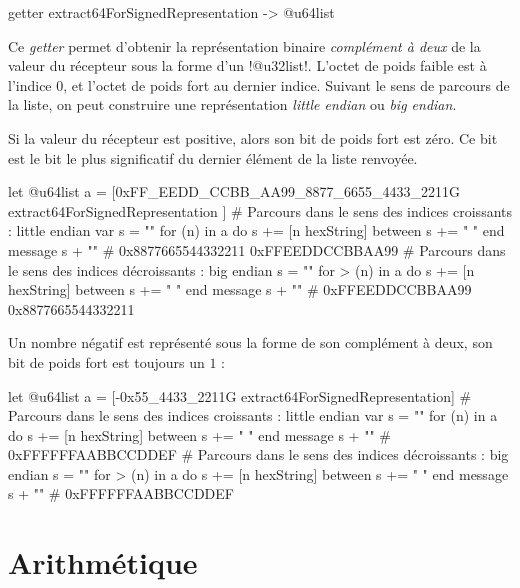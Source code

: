 
\begin{galgas4box}
getter extract64ForSignedRepresentation -> @u64list
\end{galgas4box}

Ce \emph{getter} permet d'obtenir la représentation binaire \emph{complément à deux} de la valeur du récepteur sous la forme d'un \ggsq!@u32list!. L'octet de poids faible est à l'indice $0$, et l'octet de poids fort au dernier indice. Suivant le sens de parcours de la liste, on peut construire une représentation \emph{little endian} ou \emph{big endian}.

Si la valeur du récepteur est positive, alors son bit de poids fort est zéro. Ce bit est le bit le plus significatif du dernier élément de la liste renvoyée.

\begin{galgas4}
let @u64list a = [0xFF_EEDD_CCBB_AA99_8877_6655_4433_2211G
  extract64ForSignedRepresentation
]
# Parcours dans le sens des indices croissants : little endian
var s = ""
for (n) in a
  do s += [n hexString]
  between s += " "
end
message s + "\n" # 0x8877665544332211 0xFFEEDDCCBBAA99
# Parcours dans le sens des indices décroissants : big endian
s = ""
for > (n) in a
  do s += [n hexString]
  between s += " "
end
message s + "\n" # 0xFFEEDDCCBBAA99 0x8877665544332211
\end{galgas4}

Un nombre négatif est représenté sous la forme de son complément à deux, son bit de poids fort est toujours un $1$ :

\begin{galgas4}
let @u64list a = [-0x55_4433_2211G extract64ForSignedRepresentation]
# Parcours dans le sens des indices croissants : little endian
var s = ""
for (n) in a
  do s += [n hexString]
  between s += " "
end
message s + "\n" # 0xFFFFFFAABBCCDDEF
# Parcours dans le sens des indices décroissants : big endian
s = ""
for > (n) in a
  do s += [n hexString]
  between s += " "
end
message s + "\n" # 0xFFFFFFAABBCCDDEF
\end{galgas4}














\section{Arithmétique}


